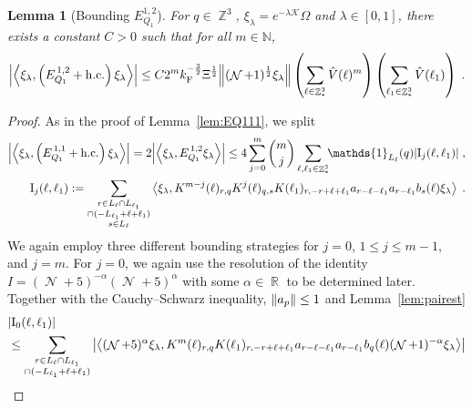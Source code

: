 \documentclass[12pt,a4paper]{article}
\numberwithin{equation}{section}
\newcommand{\cK}{\mathcal{K}}
\newcommand{\NNN}{\mathbb{N}}
\newcommand{\1}{\mathbb{I}}
\newcommand{\F}{\mathrm{F}}
\newcommand{\I}{\mathrm{I}}
\DeclareMathOperator{\R}{\mathbb{R}}
\DeclareMathOperator{\Z}{\mathbb{Z}}
\DeclareMathOperator{\NN}{\mathcal{N}}
\newcommand{\half}{\frac{1}{2}}
\newcommand{\eva}[1]{\left\langle #1 \right\rangle}
\theoremstyle{plain}
\newtheorem{lemma}[theorem]{Lemma}
\theoremstyle{definition}
\theoremstyle{remark}
\theoremstyle{plain}
\theoremstyle{definition}
\theoremstyle{remark}
\begin{document}
\begin{lemma}[Bounding $E_{Q_1}^{1,2}$]\label{lem:EQ112}
For $ q \in \Z^3 $, $\xi_\lambda = e^{-\lambda \cK} \Omega$ and $ \lambda \in [0,1] $, there exists a constant $ C > 0 $ such that for all $ m \in \NNN $,
\begin{equation}
	\abs{\eva{\xi_\lambda,\left(E^{\,1,2}_{Q_1}+\mathrm{h.c.}\right) \xi_\lambda }}\nonumber
	\leq C 2^m k_{\F}^{-\frac{3}{2}} \Xi^{\half}
		\norm{(\NN+1)^\half \xi_\lambda }
		\left(\sum\limits_{\ell\in \Z^3_*} \hat{V}(\ell)^m \right)
		\left(\sum\limits_{\ell_1\in \Z^3_*} \hat{V}(\ell_1) \right) \;. \label{eq:estEQ112}
\end{equation}
\end{lemma}
\begin{proof}
As in the proof of Lemma~\ref{lem:EQ111}, we split
\begin{equation} \label{eq:EQ1121}
\begin{aligned}
	\abs{\eva{\xi_\lambda,\left(E^{\,1,1}_{Q_1}+\mathrm{h.c.}\right) \xi_\lambda }} 
	= 2\abs{\eva{\xi_\lambda, E^{\,1,2}_{Q_1} \xi_\lambda }}
	\le 4 \sum_{j=0}^m {{m}\choose j} \sum\limits_{\ell,\ell_1  \in \Z^3_*}\!\! \mathds{1}_{L_\ell}(q) |\I_j(\ell, \ell_1)| \;,\\
	\I_j(\ell, \ell_1)
	:= \sum\limits_{\substack{r\in L_{\ell} \cap L_{\ell_1}\\ \cap (-L_{\ell_1}+\ell+\ell_1)\\ s \in L_{\ell}}} 
		\eva{\xi_\lambda, K^{m-j}(\ell)_{r,q} K^{j}(\ell)_{q,s}K(\ell_1)_{r,-r+\ell+\ell_1} a_{r-\ell-\ell_1} a_{r-\ell_1} b_{s}(\ell) \xi_\lambda} \;. \\
\end{aligned}
\end{equation}
We again employ three different bounding strategies for $ j = 0 $, $ 1 \le j \le m-1 $, and $ j = m $. For $ j = 0 $, we again use the resolution of the identity $I = (\NN+5)^{-\alpha}(\NN+5)^{\alpha}$ with some $\alpha \in \R$ to be determined later. Together with the Cauchy--Schwarz inequality, $ \norm{a_p} \le 1 $ and Lemma~\ref{lem:pairest}
\begin{align}
	&|\I_0(\ell, \ell_1)| \nonumber\\
	&\leq \sum\limits_{\substack{r\in L_{\ell} \cap L_{\ell_1}\\ \cap (-L_{\ell_1}+\ell+\ell_1)}} \abs{\eva{  (\NN+5)^{\alpha} \xi_\lambda, K^m(\ell )_{r,q} K(\ell_1)_{r,-r+\ell+\ell_1} a_{r-\ell-\ell_1} a_{r-\ell_1} b_{q}(\ell)  (\NN+1)^{-\alpha} \xi_\lambda }}\nonumber\\

\end{align}
\end{proof}
\end{document}
